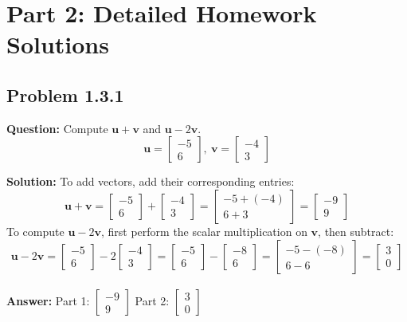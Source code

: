 \documentclass[11pt]{article}
\begin{document}
\newpage
\section{Part 2: Detailed Homework Solutions}

\subsection*{Problem 1.3.1}
\textbf{Question:} Compute $\mathbf{u} + \mathbf{v}$ and $\mathbf{u} - 2\mathbf{v}$.
\[ \mathbf{u} = \begin{bmatrix} -5 \\ 6 \end{bmatrix}, \ \mathbf{v} = \begin{bmatrix} -4 \\ 3 \end{bmatrix} \]

\textbf{Solution:}
To add vectors, add their corresponding entries:
\[ \mathbf{u} + \mathbf{v} = \begin{bmatrix} -5 \\ 6 \end{bmatrix} + \begin{bmatrix} -4 \\ 3 \end{bmatrix} = \begin{bmatrix} -5 + (-4) \\ 6 + 3 \end{bmatrix} = \begin{bmatrix} -9 \\ 9 \end{bmatrix} \]
To compute $\mathbf{u} - 2\mathbf{v}$, first perform the scalar multiplication on $\mathbf{v}$, then subtract:
\[ \mathbf{u} - 2\mathbf{v} = \begin{bmatrix} -5 \\ 6 \end{bmatrix} - 2\begin{bmatrix} -4 \\ 3 \end{bmatrix} = \begin{bmatrix} -5 \\ 6 \end{bmatrix} - \begin{bmatrix} -8 \\ 6 \end{bmatrix} = \begin{bmatrix} -5 - (-8) \\ 6 - 6 \end{bmatrix} = \begin{bmatrix} 3 \\ 0 \end{bmatrix} \]
\\
\textbf{Answer:} 
Part 1: $\begin{bmatrix} -9 \\ 9 \end{bmatrix}$ \quad Part 2: $\begin{bmatrix} 3 \\ 0 \end{bmatrix}$
\end{document}
